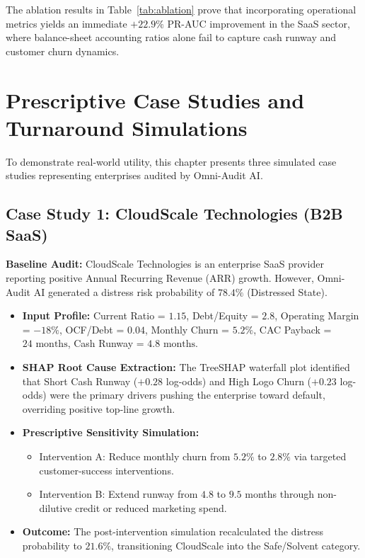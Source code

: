 \documentclass[11pt, a4paper]{article}
\begin{document}
The ablation results in Table~\ref{tab:ablation} prove that incorporating operational metrics yields an immediate $+22.9\%$ PR-AUC improvement in the SaaS sector, where balance-sheet accounting ratios alone fail to capture cash runway and customer churn dynamics.

\clearpage

\section{Prescriptive Case Studies and Turnaround Simulations}

To demonstrate real-world utility, this chapter presents three simulated case studies representing enterprises audited by Omni-Audit AI.

\subsection{Case Study 1: CloudScale Technologies (B2B SaaS)}
\textbf{Baseline Audit:} CloudScale Technologies is an enterprise SaaS provider reporting positive Annual Recurring Revenue (ARR) growth. However, Omni-Audit AI generated a distress risk probability of $\mathbf{78.4\%}$ (Distressed State).

\begin{itemize}
    \item \textbf{Input Profile:} Current Ratio = $1.15$, Debt/Equity = $2.8$, Operating Margin = $-18\%$, OCF/Debt = $0.04$, Monthly Churn = $5.2\%$, CAC Payback = $24\text{ months}$, Cash Runway = $4.8\text{ months}$.
    \item \textbf{SHAP Root Cause Extraction:} The TreeSHAP waterfall plot identified that Short Cash Runway ($+0.28$ log-odds) and High Logo Churn ($+0.23$ log-odds) were the primary drivers pushing the enterprise toward default, overriding positive top-line growth.
    \item \textbf{Prescriptive Sensitivity Simulation:} 
    \begin{itemize}
        \item Intervention A: Reduce monthly churn from $5.2\%$ to $2.8\%$ via targeted customer-success interventions.
        \item Intervention B: Extend runway from $4.8$ to $9.5$ months through non-dilutive credit or reduced marketing spend.
    \end{itemize}
    \item \textbf{Outcome:} The post-intervention simulation recalculated the distress probability to $\mathbf{21.6\%}$, transitioning CloudScale into the Safe/Solvent category.
\end{itemize}
\end{document}
